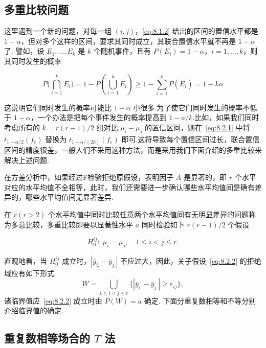 \subsection{多重比较问题}

这里遇到一个新的问题，对每一组 $(i, j)$，\eqref{eq:8.1.2} 给出的区间的置信水平都是 $1-\alpha$，但对多个这样的区间，要求其同时成立，其联合置信水平就不再是  $1-\alpha$ 了. 譬如，设 $E_1,\ldots, E_k$ 是 $k$ 个随机事件，且有 $P(E_i)=1-\alpha$，$i=1,\ldots, k$，则其同时发生的概率 

\begin{equation}
  P\big(\bigcap_{i=1}^{k} E_{i}\big)=1-P\left(\bigcup_{i=1}^{k} \bar{E}_{i}\right) \geqslant 1-\sum_{i=1}^{k} P\left(\bar{E}_{i}\right)=1-k \alpha
\end{equation}

这说明它们同时发生的概率可能比 $1-\alpha$ 小很多.为了使它们同时发生的概率不低于 $1-\alpha$，一个办法是把每个事件发生的概率提高到 $1-a/k$.比如，如果我们同时考虑所有的 $k = r(r-1)/2$ 组对比 $\mu_i - \mu_j$ 的置信区间，则在~\eqref{eq:8.2.1} 中将 $t_{1-\alpha/2}(f_e)$ 替换为 $t_{1-\alpha/(2k)}(f_e)$ 即可.这将导致每个置信区间过长，联合置信区间的精度很差，一般人们不采用这种方法，而是采用我们下面介绍的多重比较来解决上述问题.

在方差分析中，如果经过F检验拒绝原假设，表明因子 $A$ 是显著的，即 $r$ 个水平对应的水平均值不全相等，此时，我们还需要进一步确认哪些水平均值间是确有差异的，哪些水平均值间无显著差异. 

在 $r(r>2)$ 个水平均值中同时比较任意两个水平均值间有无明显差异的问题称为多意比较，多重比较即要以显著性水平 $a$ 同时检验如下 $r(r-1)/2$ 个假设

\begin{equation}\label{eq:8.2.2}
  H_{0}^{ij}:\; \mu_i = \mu_j,\quad 1 \leq i < j \leq r.
\end{equation}

直观地看，当 $H_{0}^{ij}$ 成立时，$|\bar{y}_{i.} - \bar{y}_{j.}|$ 不应过大，因此，关子假设~\eqref{eq:8.2.2} 的拒绝域应有如下形式
\begin{equation*}
  W = \bigcup_{1\leq i < j \leq r}\{|\bar{y}_{i.} - \bar{y}_{j.}| \geq \varepsilon_{ij}\},
\end{equation*}
诸临界值应~\eqref{eq:8.2.2} 成立时由 $P(W)=a$ 确定. 下面分重复数相等和不等分别介绍临界值的确定.

\subsection[重复数相等场合的 T 法]{重复数相等场合的 $T$ 法}

